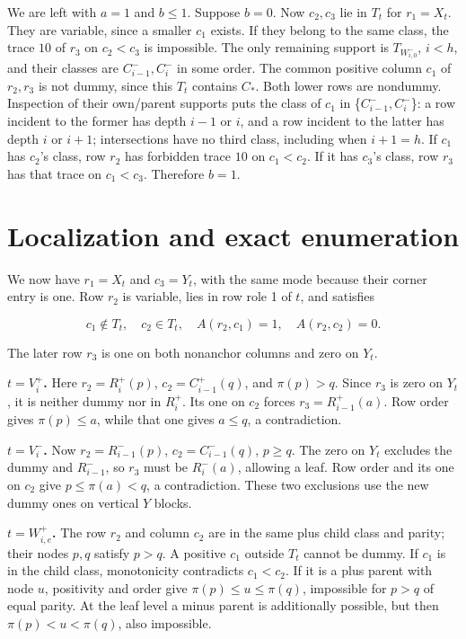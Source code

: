 \documentclass[11pt,letterpaper]{article}
\begin{document}
We are left with \(a=1\) and \(b\le 1\). Suppose \(b=0\). Now
\(c_{2},c_{3}\) lie in \(T_t\) for \(r_{1}=X_t\). They are variable,
since a smaller \(c_{1}\) exists. If they belong to the same class, the
trace \(10\) of \(r_{3}\) on \(c_{2}<c_{3}\) is impossible. The only
remaining support is \(T_{W_{i,0}^-}\), \(i<h\), and their classes are
\(C_{i-1}^-,C_i^-\) in some order. The common positive column \(c_{1}\)
of \(r_{2},r_{3}\) is not dummy, since this \(T_t\) contains \(C_*\).
Both lower rows are nondummy. Inspection of their own/parent supports
puts the class of \(c_{1}\) in \{\(C_{i-1}^-,C_i^-\)\}: a row incident
to the former has depth \(i-1\) or \(i\), and a row incident to the
latter has depth \(i\) or \(i+1\); intersections have no third class,
including when \(i+1=h\). If \(c_{1}\) has \(c_{2}\)'s class, row
\(r_{2}\) has forbidden trace \(10\) on \(c_{1}<c_{2}\). If it has
\(c_{3}\)'s class, row \(r_{3}\) has that trace on \(c_{1}<c_{3}\).
Therefore \(b=1\).

\section{Localization and exact
enumeration}\label{localization-and-exact-enumeration}

We now have \(r_{1}=X_t\) and \(c_{3}=Y_t\), with the same mode because
their corner entry is one. Row \(r_{2}\) is variable, lies in row role 1
of \(t\), and satisfies

\[
 c_1\notin T_t,\quad c_2\in T_t,\quad
 A(r_2,c_1)=1,\quad A(r_2,c_2)=0.
\]

The later row \(r_{3}\) is one on both nonanchor columns and zero on
\(Y_t\).

\textbf{\boldmath \(t=V_i^+\).} Here \(r_{2}=R_i^+(p)\),
\(c_{2}=C_{i-1}^+(q)\), and \(\pi (p)>q\). Since \(r_{3}\) is zero on
\(Y_t\), it is neither dummy nor in \(R_i^+\). Its one on \(c_{2}\)
forces \(r_{3}=R_{i-1}^+(a)\). Row order gives \(\pi (p)\le a\), while
that one gives \(a\le q\), a contradiction.

\textbf{\boldmath \(t=V_i^-\).} Now \(r_{2}=R_{i-1}^-(p)\),
\(c_{2}=C_{i-1}^-(q)\), \(p\ge q\). The zero on \(Y_t\) excludes the
dummy and \(R_{i-1}^-\), so \(r_{3}\) must be \(R_i^-(a)\), allowing a
leaf. Row order and its one on \(c_{2}\) give \(p\le \pi (a)<q\), a
contradiction. These two exclusions use the new dummy ones on vertical
\(Y\) blocks.

\textbf{\boldmath \(t=W_{i,e}^+\).} The row \(r_{2}\) and column
\(c_{2}\) are in the same plus child class and parity; their nodes
\(p,q\) satisfy \(p>q\). A positive \(c_{1}\) outside \(T_t\) cannot be
dummy. If \(c_{1}\) is in the child class, monotonicity contradicts
\(c_{1}<c_{2}\). If it is a plus parent with node \(u\), positivity and
order give \(\pi (p)\le u\le \pi (q)\), impossible for \(p>q\) of equal
parity. At the leaf level a minus parent is additionally possible, but
then \(\pi (p)<u<\pi (q)\), also impossible.
\end{document}
